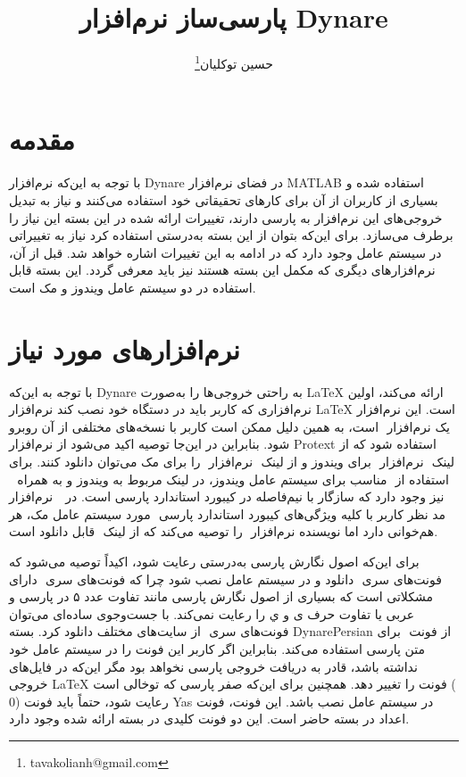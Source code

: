 \documentclass[12pt]{article}
\title{پارسی‌ساز نرم‌افزار Dynare}
\author{حسین توکلیان\thanks{tavakolianh@gmail.com} }%
\affil{عضو هیئت علمی دانشکده اقتصاد دانشگاه علامه طباطبائی}
\begin{document}
 
\maketitle

\section{مقدمه}
با توجه به این‌که نرم‌افزار Dynare در فضای نرم‌افزار MATLAB استفاده شده و بسیاری از کاربران از آن برای کارهای تحقیقاتی خود استفاده می‌کنند و نیاز به تبدیل خروجی‌های این نرم‌افزار به پارسی دارند، تغییرات ارائه شده در این بسته این نیاز را برطرف می‌سازد. برای این‌که بتوان از این بسته به‌درستی استفاده کرد نیاز به تغییراتی در سیستم عامل وجود دارد که در ادامه به این تغییرات اشاره خواهد شد. قبل از آن، نرم‌افزارهای دیگری که مکمل این بسته هستند نیز باید معرفی گردد. این بسته قابل استفاده در دو سیستم عامل ویندوز و مک است. 
\section{نرم‌افزارهای مورد نیاز}
با توجه به این‌که Dynare به راحتی خروجی‌ها را به‌صورت ‪\LaTeX‬‬‬ ارائه می‌کند، اولین نرم‌افزاری که کاربر باید در دستگاه خود نصب کند نرم‌افزار ‪\LaTeX‬‬ است. این نرم‌افزار یک نرم‌افزار ‪‬‬‬ است، به همین دلیل ممکن است کاربر با نسخه‌های مختلفی از آن روبرو شود. بنابراین در این‌جا توصیه اکید می‌شود از نرم‌افزار Protext استفاده شود که از لینک ‪‬‬‬ نرم‌افزار ‪‬‬ برای ویندوز و از لینک ‪‬‬‬ نرم‌افزار ‪‬‬‬ را برای مک می‌توان دانلود کنند. برای استفاده از ‪‬‬‬ مناسب برای سیستم عامل ویندوز، در لینک مربوط به ویندوز و به همراه ‪‬‬ ‬‬ نرم‌افزار ‪‬‬ ‬‬‪  نیز وجود دارد که سازگار با نیم‌فاصله در کیبورد استاندارد پارسی است. در مورد سیستم عامل مک، هر ‪‬‬ ‬‬‬مد نظر کاربر با کلیه ویژگی‌های کیبورد استاندارد پارسی هم‌خوانی دارد اما نویسنده نرم‌افزار ‪‬‬ ‬‬‬را توصیه می‌کند که از لینک ‪‬‬‬ قابل دانلود است.

برای این‌که اصول نگارش پارسی به‌درستی رعایت شود، اکیداً توصیه می‌شود که فونت‌های سری ‪‬‬ دانلود و در سیستم‌ عامل نصب شود چرا که فونت‌های سری ‪‬‬ دارای مشکلاتی است که بسیاری از اصول نگارش پارسی مانند تفاوت عدد ۵ در پارسی و عربی یا تفاوت حرف ی و ي را رعایت نمی‌کند. با جست‌وجوی ساده‌ای می‌توان فونت‌های سری ‪‬‬ از سایت‌های مختلف دانلود کرد. بسته DynarePersian از فونت ‪‬‬‬ برای متن پارسی استفاده می‌کند. بنابراین اگر کاربر این فونت را در سیستم عامل خود نداشته باشد، قادر به دریافت خروجی پارسی نخواهد بود مگر این‌که در فایل‌های خروجی ‪\LaTeX‬‬‬ فونت را تغییر دهد. همچنین برای این‌که صفر پارسی که توخالی است (‪$0$‬‬‬‬) رعایت شود، حتماً باید فونت Yas در سیستم عامل نصب باشد. این فونت، فونت اعداد در بسته حاضر است. این دو فونت کلیدی در بسته ارائه شده وجود دارد.
\end{document}
